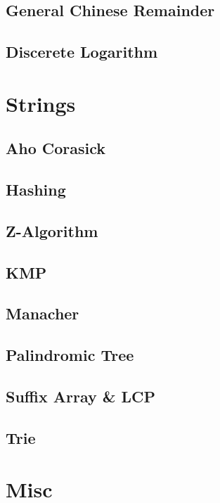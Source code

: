 		\subsection{General Chinese Remainder}
			
		\subsection{Discerete Logarithm}
			
	\section{Strings}
		\subsection{Aho Corasick}
			
		\subsection{Hashing}
			
		\subsection{Z-Algorithm}
			
		\subsection{KMP}
			
		\subsection{Manacher}
			
		\subsection{Palindromic Tree}
			
		\subsection{Suffix Array \& LCP}
			
		\subsection{Trie}
			
	\section{Misc}
